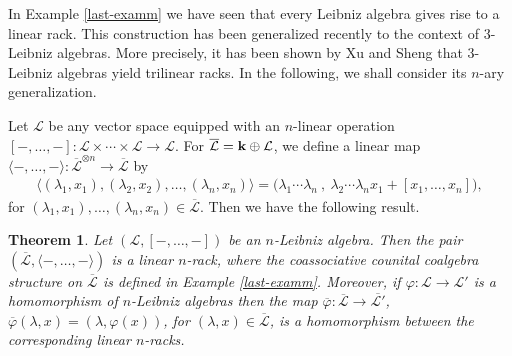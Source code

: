 \documentclass[a4paper,reqno,10pt]{amsart}
\theoremstyle{plain}
\newtheorem{thm}{Theorem}[section]
\theoremstyle{definition}
\theoremstyle{remark}
\begin{document}
\medskip

In Example \ref{last-examm} we have seen that every Leibniz algebra gives rise to a linear rack. This construction has been generalized recently to the context of $3$-Leibniz algebras. More precisely, it has been shown by Xu and Sheng \cite{xu-sheng} that $3$-Leibniz algebras yield trilinear racks. In the following, we shall consider its $n$-ary generalization.

Let $\mathcal{L}$ be any vector space equipped with an $n$-linear operation $[-, \ldots, -] : \mathcal{L} \times \cdots \times \mathcal{L} \rightarrow \mathcal{L}$. For $\overline{\mathcal{L}} = {\bf k} \oplus \mathcal{L}$, we define a linear map $\langle -, \ldots, - \rangle : \overline{ \mathcal{L}}^{\otimes n} \rightarrow \overline{ \mathcal{L}}$ by
\begin{align*}
    \langle (\lambda_1, x_1), (\lambda_2, x_2), \ldots,(\lambda_n, x_n) \rangle = \big( \lambda_1 \cdots \lambda_n ~ \! , ~ \! \lambda_2 \cdots \lambda_n x_1 + [x_1, \ldots, x_n ] \big),
\end{align*}
for $(\lambda_1, x_1),  \ldots,(\lambda_n, x_n) \in \overline{\mathcal{L}}.$ Then we have the following result.

\begin{thm}\label{thm-nleib-lin}
    Let $(\mathcal{L}, [-, \ldots, -])$ be an $n$-Leibniz algebra. Then the pair $(\overline{\mathcal{L}}, \langle -, \ldots, - \rangle)$ is a linear $n$-rack, where the coassociative counital coalgebra structure on $\overline{\mathcal{L}}$ is defined in Example \ref{last-examm}. Moreover, if $\varphi : \mathcal{L} \rightarrow \mathcal{L}'$ is a homomorphism of $n$-Leibniz algebras then the map $\overline{\varphi} : \overline{\mathcal{L}} \rightarrow \overline{\mathcal{L}'}$, $\overline{\varphi} (\lambda, x) = (\lambda, \varphi(x))$, for $(\lambda, x) \in \overline{\mathcal{L}}$, is a homomorphism between the corresponding linear $n$-racks.
\end{thm}
\end{document}
